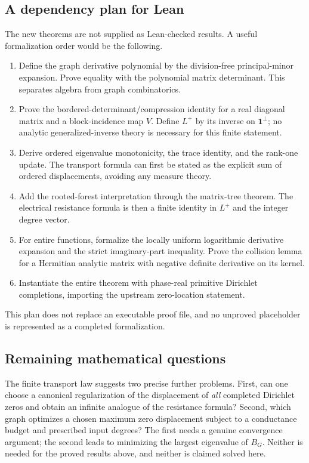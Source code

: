 \subsection{A dependency plan for Lean}

The new theorems are not supplied as Lean-checked results.  A useful
formalization order would be the following.
\begin{enumerate}
 \item Define the graph derivative polynomial by the division-free
 principal-minor expansion.  Prove equality with the polynomial matrix
 determinant.  This separates algebra from graph combinatorics.
 \item Prove the bordered-determinant/compression identity for a real
 diagonal matrix and a block-incidence map $V$.  Define $L^+$ by its
 inverse on $\boldsymbol1^\perp$; no analytic generalized-inverse theory
 is necessary for this finite statement.
 \item Derive ordered eigenvalue monotonicity, the trace identity, and the
 rank-one update.  The transport formula can first be stated as the
 explicit sum of ordered displacements, avoiding any measure theory.
 \item Add the rooted-forest interpretation through the matrix-tree
 theorem.  The electrical resistance formula is then a finite identity
 in $L^+$ and the integer degree vector.
 \item For entire functions, formalize the locally uniform logarithmic
 derivative expansion and the strict imaginary-part inequality.  Prove
 the collision lemma for a Hermitian analytic matrix with negative
 definite derivative on its kernel.
 \item Instantiate the entire theorem with phase-real primitive
 Dirichlet completions, importing the upstream zero-location statement.
\end{enumerate}
This plan does not replace an executable proof file, and no unproved
placeholder is represented as a completed formalization.

\subsection{Remaining mathematical questions}

The finite transport law suggests two precise further problems.  First,
can one choose a canonical regularization of the displacement of
\emph{all} completed Dirichlet zeros and obtain an infinite analogue of
the resistance formula?  Second, which graph optimizes a chosen maximum
zero displacement subject to a conductance budget and prescribed input
degrees?  The first needs a genuine convergence argument; the second
leads to minimizing the largest eigenvalue of $B_G$.  Neither is needed
for the proved results above, and neither is claimed solved here.
